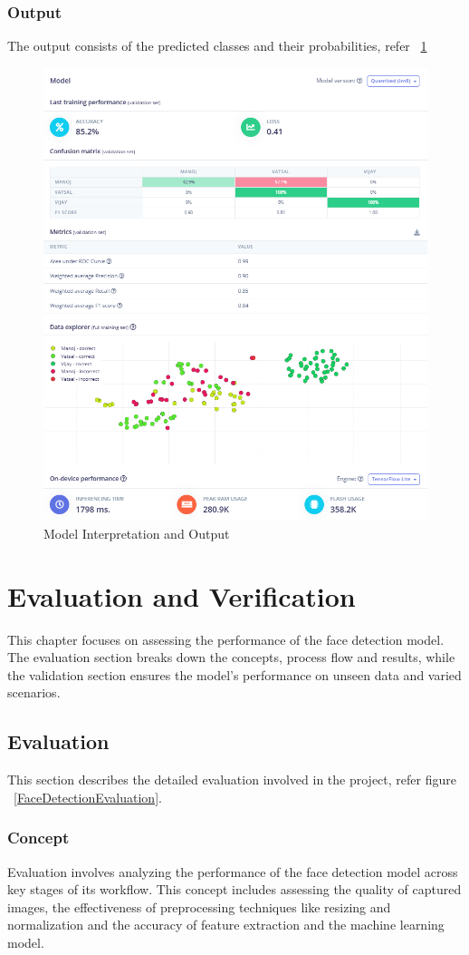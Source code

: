 \subsection{Output}
The output consists of the predicted classes and their probabilities, refer ~\ref{Interpretation}
\begin{figure}
	\begin{center}
		\includegraphics[width=0.7\linewidth]{Images/EdgeImpulse/Interpretation.png}
		\caption{Model Interpretation and Output}
		\label{Interpretation}
	\end{center}
\end{figure}


\chapter{Evaluation and Verification}
This chapter focuses on assessing the performance of the face detection model. The evaluation section breaks down the concepts, process flow and results, while the validation section ensures the model’s performance on unseen data and varied scenarios. \cite{IEEE:1997}

\section{Evaluation}
This section describes the detailed evaluation involved in the project, refer figure ~\ref{FaceDetectionEvaluation}.

\subsection{Concept}
Evaluation involves analyzing the performance of the face detection model across key stages of its workflow. This concept includes assessing the quality of captured images, the effectiveness of preprocessing techniques like resizing and normalization and the accuracy of feature extraction and the machine learning model.


